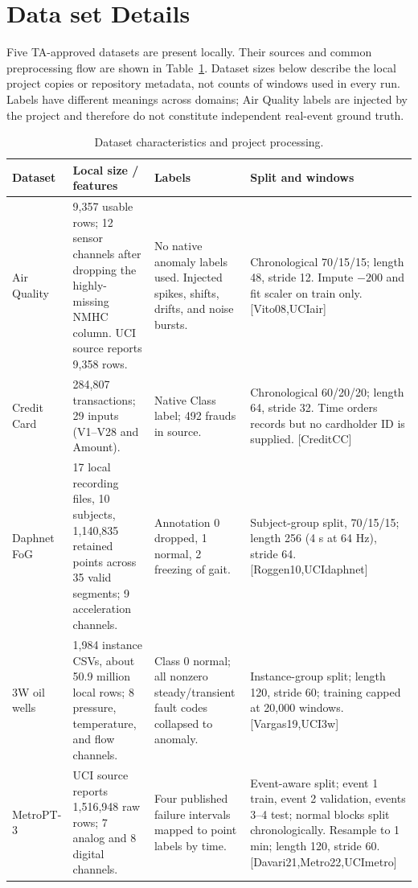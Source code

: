 \documentclass[twoside,english]{article}
\renewcommand{\cite}[1]{[#1]}
\begin{document}
\section{Data set Details} \label{sec:data}
Five TA-approved datasets are present locally. Their sources and common preprocessing flow are shown in Table~\ref{tab:data}. Dataset sizes below describe the local project copies or repository metadata, not counts of windows used in every run. Labels have different meanings across domains; Air Quality labels are injected by the project and therefore do not constitute independent real-event ground truth.

\begin{table}[t]
\centering
\caption{Dataset characteristics and project processing.}
\label{tab:data}
\small
\begin{tabular}{p{1.1in}p{1.35in}p{1.45in}p{2.05in}}
\toprule
Dataset & Local size / features & Labels & Split and windows \\
\midrule
Air Quality & 9,357 usable rows; 12 sensor channels after dropping the highly-missing NMHC column. UCI source reports 9,358 rows. & No native anomaly labels used. Injected spikes, shifts, drifts, and noise bursts. & Chronological 70/15/15; length 48, stride 12. Impute $-200$ and fit scaler on train only. \cite{Vito08,UCIair} \\
Credit Card & 284,807 transactions; 29 inputs (V1--V28 and Amount). & Native Class label; 492 frauds in source. & Chronological 60/20/20; length 64, stride 32. Time orders records but no cardholder ID is supplied. \cite{CreditCC} \\
Daphnet FoG & 17 local recording files, 10 subjects, 1,140,835 retained points across 35 valid segments; 9 acceleration channels. & Annotation 0 dropped, 1 normal, 2 freezing of gait. & Subject-group split, 70/15/15; length 256 (4 s at 64 Hz), stride 64. \cite{Roggen10,UCIdaphnet} \\
3W oil wells & 1,984 instance CSVs, about 50.9 million local rows; 8 pressure, temperature, and flow channels. & Class 0 normal; all nonzero steady/transient fault codes collapsed to anomaly. & Instance-group split; length 120, stride 60; training capped at 20,000 windows. \cite{Vargas19,UCI3w} \\
MetroPT-3 & UCI source reports 1,516,948 raw rows; 7 analog and 8 digital channels. & Four published failure intervals mapped to point labels by time. & Event-aware split; event 1 train, event 2 validation, events 3--4 test; normal blocks split chronologically. Resample to 1 min; length 120, stride 60. \cite{Davari21,Metro22,UCImetro} \\
\bottomrule
\end{tabular}
\end{table}
\end{document}
